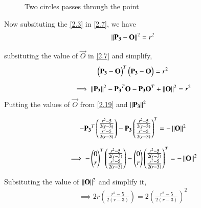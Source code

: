 \documentclass[journal,12pt,twocolumn]{IEEEtran}
\begin{document}
\begin{figure}[!htb]
	\centering
	\resizebox{\columnwidth}{!}{}
	\caption{Two circles passes through the point}
\end{figure}


Now subsituting the \ref{2.3} in \ref{2.7}, we have
\begin{align}
\left\lVert  \mathbf{ P_3} - \mathbf{O}\right\rVert^{2} = r^{2} \label{2.20}
\end{align}

subsituting the value of $\vec{O}$ in \ref{2.7} and simplify,
\begin{align}
\begin{pmatrix}\mathbf{P_3} - \mathbf{O}\end{pmatrix}^T\begin{pmatrix}\mathbf{P_3} - \mathbf{O}\end{pmatrix} = r^2 \label{2.21}
\end{align}


\begin{align}
 \implies \left\lVert\mathbf{P_3}\right\rVert^2 - \mathbf{P_3}^T\mathbf{O}  -  \mathbf{P_3} \mathbf{O}^T +\left\lVert\mathbf{O}\right\rVert^2 = r^2 \label{2.22.1}
\end{align}
Putting the values  of $\vec{O}$ from \ref{2.19} and $\left\lVert\mathbf{P_3}\right\rVert^2$

\begin{align}
 - \mathbf{P_3}^T\begin{pmatrix} \frac{r^2 - 5}{2 \left(r - 3\right)} \\ \frac{r^2 - 5}{2 \left(r - 3\right)} \\\end{pmatrix}  -  \mathbf{P_3} \begin{pmatrix} \frac{r^2 - 5}{2 \left(r - 3\right)} \\ \frac{r^2 - 5}{2 \left(r - 3\right)} \\\end{pmatrix}^T    = -  \left\lVert\mathbf{O}\right\rVert^2 \label{2.22.2}
\end{align}



\begin{align}
\implies - \begin{pmatrix}0 \\ r\end{pmatrix}^T\begin{pmatrix} \frac{r^2 - 5}{2 \left(r - 3\right)} \\ \frac{r^2 - 5}{2 \left(r - 3\right)} \\\end{pmatrix}  -  \begin{pmatrix}0 \\ r\end{pmatrix} \begin{pmatrix} \frac{r^2 - 5}{2 \left(r - 3\right)} \\ \frac{r^2 - 5}{2 \left(r - 3\right)} \\\end{pmatrix}^T    = -  \left\lVert\mathbf{O}\right\rVert^2 \label{2.22.2}
\end{align}

Subsituting the value of $\left\lVert\mathbf{O}\right\rVert^2$ and simplify it,
\begin{align}
\implies 2r \left( \frac{r^2 - 5}{2 \left(r - 3\right)} \right) = 2 \left( \frac{r^2 - 5}{2 \left(r - 3\right)} \right)^2 
\end{align}
\end{document}

